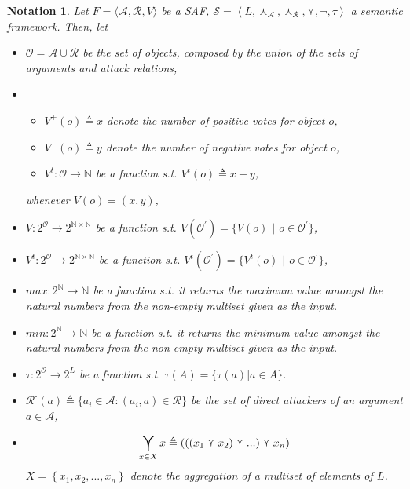\documentclass{article}
\newtheorem{notation}{Notation}
\newcommand{\nat}{\mathbb{N}}   %
\newcommand{\real}{\mathbb{R}}  %
\newcommand{\args}{\mathcal{A}} %
\newcommand{\att}{\mathcal{R}}  %
\newcommand{\valueset}{L}
\newcommand{\obj}{\mathcal{O}} %
\newcommand{\attackers}[1]{\att^\text{-}\left(#1\right)}
\newcommand{\safid}{F}               %
\newcommand{\saf}{\safid = \safbody} %
\newcommand{\safbody}{\langle \args, \att, V \rangle} %
\newcommand{\sembodyNew}{\left\langle \valueset,\SAFand_\mathcal{A}, \SAFand_\mathcal{R},\SAFor,\lnot,\tau \right\rangle} %
\newcommand{\SAFand}{\curlywedge}     %
\newcommand{\SAFor}{\curlyvee}        %
\DeclareMathOperator*{\SAFOr}{\bigcurlyvee} %
\newcommand{\sem}{\mathcal{S}}
\newcommand{\ssset}{\mathcal{T}}   %
\begin{document}
\begin{notation}
Let $\saf$ be a SAF, $\sem = \sembodyNew$ a semantic framework. Then, let
\begin{itemize}
 \item $\obj = \args \cup \att$ be the set of objects, composed by the union of the sets of arguments and attack relations,
\item
\begin{itemize}
\item $V^{+} (o) \triangleq x$ denote the number of positive votes for object $o$,
\item $V^{-} (o) \triangleq y$ denote the number of negative votes for object $o$,
\item $V^t: \obj \to \nat$ be a function s.t. $V^t(o) \triangleq x + y$,  
\end{itemize}
whenever $V(o) = (x, y)$,
\\
\item $V: 2^\obj \to 2^{\nat \times \nat}$ be a function s.t. $V(\mathcal{O}^{'}) = \{V(o)$ $|$ $o \in \mathcal{O}^{'}\}$,
\item $V^{t}: 2^\obj \to 2^{\nat \times \nat}$ be a function s.t. $V^t(\mathcal{O}^{'}) = \{V^t(o)$ $|$ $o \in \mathcal{O}^{'}\}$,
\item $max: 2^{\nat} \to \nat$ be a function s.t. it returns the maximum value amongst the natural numbers from the non-empty multiset given as the input.
\item $min: 2^{\nat} \to \nat$ be a function s.t. it returns the minimum value amongst the natural numbers from the non-empty multiset given as the input.
\item  $\tau:2^{\obj} \to 2^{L}$ be a function s.t. $\tau(A) = \{\tau(a)|a\in A\}$.%
\item $\attackers{a} \triangleq \{a_i \in \args: (a_i, a) \in \att\}$ be the set of direct attackers of an argument $a \in \args$, 
\item$$\SAFOr_{x \in X} x \triangleq\left(\left(\left(  x_{1}\SAFor x_{2}\right) \SAFor...\right)\SAFor x_{n}\right)$$ $X=\left\{  x_{1},x_{2},...,x_{n}\right\}$ denote the aggregation of a multiset of elements of $\valueset$. 
\end{itemize}
\end{notation}
\end{document}

